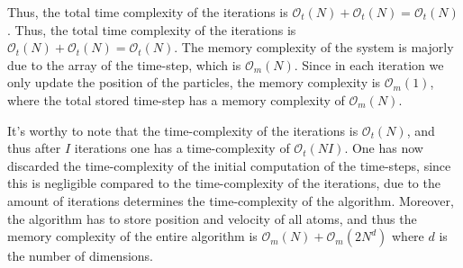 \documentclass[a4paper]{article}
\newcommand{\newparagraph}{\vspace{.5cm}\noindent}
\begin{document}
\newparagraph
Thus, the total time complexity of the iterations is $\mathcal{O}_t(N) + \mathcal{O}_t(N) = \mathcal{O}_t(N)$. Thus, the total time complexity of the iterations is $\mathcal{O}_t(N) + \mathcal{O}_t(N) = \mathcal{O}_t(N)$. The memory complexity of the system is majorly due to the array of the time-step, which is $\mathcal{O}_m(N)$.
Since in each iteration we only update the position of the particles, the memory complexity is $\mathcal{O}_m(1)$, where the total stored time-step has a memory complexity of $\mathcal{O}_m(N)$.

\newparagraph
It's worthy to note that the time-complexity of the iterations is $\mathcal{O}_t(N)$, and thus after $I$ iterations one has a time-complexity of $\mathcal{O}_t(NI)$.
One has now discarded the time-complexity of the initial computation of the time-steps, since this is negligible compared to the time-complexity of the iterations, due to the amount of iterations determines the time-complexity of the algorithm.
Moreover, the algorithm has to store position and velocity of all atoms, and thus the memory complexity of the entire algorithm is $\mathcal{O}_m(N) + \mathcal{O}_m(2N^d)$ where $d$ is the number of dimensions.
\end{document}
